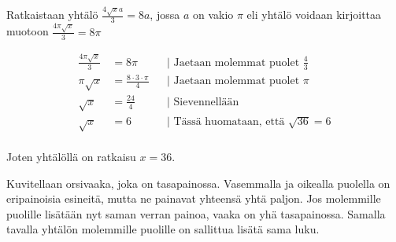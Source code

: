 \begin{esimerkki}
Ratkaistaan yhtälö $\frac{4\sqrt{x}a}{3}=8a$, jossa $a$ on vakio $\pi$ eli yhtälö voidaan kirjoittaa muotoon $\frac{4\pi\sqrt{x}}{3}=8\pi$

		\begin{align*}
			\frac{4 \pi \sqrt{x}}{3} &= 8 {\pi} && \text{| Jaetaan molemmat puolet $\frac{4}{3}$} \\
			{\pi}\sqrt{x} &= \frac{8\cdot 3\cdot {\pi}}{4} && \text{| Jaetaan molemmat puolet $\pi$} \\
			\sqrt{x} &= \frac{24}{4} && \text{| Sievennellään} \\
			\sqrt{x} &= 6 && \text{| Tässä huomataan, että $\sqrt{36}=6$} \\
\end{align*}

Joten yhtälöllä on ratkaisu $x=36$.

\end{esimerkki}

\begin{esimerkki}
	Kuvitellaan orsivaaka, joka on tasapainossa. Vasemmalla ja oikealla puolella on eripainoisia esineitä, mutta ne painavat yhteensä yhtä paljon. Jos molemmille puolille lisätään nyt saman verran painoa, vaaka on yhä tasapainossa. Samalla tavalla yhtälön molemmille puolille on sallittua lisätä sama luku.
\end{esimerkki}

